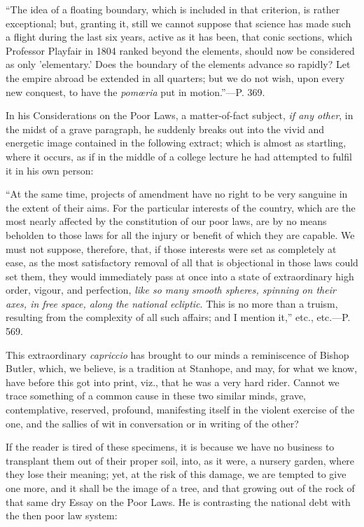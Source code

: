 ``The
idea of a floating boundary, which is included in that criterion, is
rather exceptional; but, granting it, still we cannot suppose that
science has made such a flight during the last six years, active as it
has been, that conic sections, which Professor Playfair in 1804 ranked
beyond the elements, should now be considered as only 'elementary.'
Does the boundary of the elements advance so rapidly? Let the empire
abroad be extended in all quarters; but we do not wish, upon every new
conquest, to have the \emph{pomœria} put in motion.''—P. 369.

In his Considerations on the Poor Laws, a
matter-of-fact subject, \emph{if any other}, in the midst of a grave
paragraph, he suddenly breaks out into the vivid and energetic image
contained in the following extract; which is almost as startling,
where it occurs, as if in the middle of a college lecture he had
attempted to fulfil it in his own person:

``At
the same time, projects of amendment have no right to be very sanguine
in the extent of their aims. For the particular interests of the
country, which are the most nearly affected by the constitution of our
poor laws, are by no means beholden to those laws for all the injury
or benefit of which they are capable. We must not suppose, therefore,
that, if those interests were set as completely
at ease, as the most satisfactory removal of all that is objectional
in those laws could set them, they would immediately pass at once into
a state of extraordinary high order, vigour, and perfection, \emph{like
so many smooth spheres, spinning on their axes, in free space, along
the national ecliptic}. This is no more than a truism, resulting
from the complexity of all such affairs; and I mention it,'' etc.,
etc.—P. 569.

This extraordinary \emph{capriccio}
has brought to our minds a reminiscence of Bishop Butler, which, we
believe, is a tradition at Stanhope, and may, for what we know, have
before this got into print, viz., that he was a very hard rider.
Cannot we trace something of a common cause in these two similar
minds, grave, contemplative, reserved, profound, manifesting itself in
the violent exercise of the one, and the sallies of wit in
conversation or in writing of the other?

If the reader is tired of these specimens, it is
because we have no business to transplant them out of their proper
soil, into, as it were, a nursery garden, where they lose their
meaning; yet, at the risk of this damage, we are tempted to give one
more, and it shall be the image of a tree, and that growing out of the
rock of that same dry Essay on the Poor Laws. He is contrasting the
national debt with the then poor law system:

